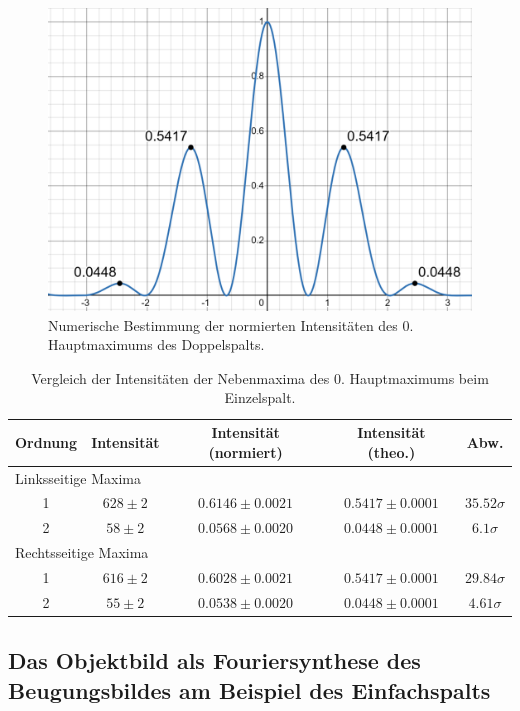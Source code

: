 \begin{figure}[H]
  \centering
  \includegraphics[width=.9\textwidth]{files/plots/3/ds_intensitaeten_desmos.png}
  \caption{Numerische Bestimmung der normierten Intensitäten des 0. Hauptmaximums des Doppelspalts.}
  \label{fig:ds_intensitaeten_desmos}
\end{figure}


\begin{table}[H]
  \centering
  \caption{Vergleich der Intensitäten der Nebenmaxima des 0. Hauptmaximums beim Einzelspalt.}
  \vspace*{0.5em}
  \begin{tabular}{|c|c|c|c|c|}\hline
    Ordnung & Intensität & Intensität (normiert) & Intensität (theo.) & Abw.\\\hline
    \multicolumn{5}{|l|}{Linksseitige Maxima}\\\hline
    1 & $628 \pm 2$   & $0.6146 \pm 0.0021$    &  $0.5417 \pm 0.0001$     &   $35.52\sigma$\\
    2 & $58 \pm 2$    & $0.0568 \pm 0.0020$    &  $0.0448 \pm 0.0001$     &   $6.1\sigma$\\\hline
    \multicolumn{5}{|l|}{Rechtsseitige Maxima}\\\hline
    1 & $616 \pm 2$  &  $0.6028 \pm 0.0021$    &  $0.5417 \pm 0.0001$   &     $29.84\sigma$\\
    2 & $55 \pm 2$   &  $0.0538 \pm 0.0020$    &  $0.0448 \pm 0.0001$   &     $4.61\sigma$\\\hline
  \end{tabular}
  \label{tab:es_vergleich_intensitaet}
\end{table}

\newpage
\subsection{Das Objektbild als Fouriersynthese des Beugungsbildes am Beispiel des Einfachspalts}

